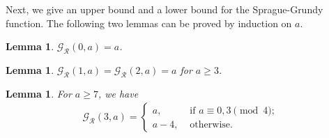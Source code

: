 \documentclass[12pt]{amsart}
\theoremstyle{plain}
\newtheorem{lemma}[proposition]{Lemma}
\theoremstyle{definition}
\theoremstyle{remark}
\begin{document}
Next, we give an upper bound and a lower bound for the Sprague-Grundy function. The following two lemmas can be proved by induction on $a$.

\smallskip
\begin{lemma} \label{BW-R0}
${\mathcal{G}}_{\mathcal{R}}(0,a) = a$.
\end{lemma}

\smallskip
\begin{lemma} \label{BW-R12}
${\mathcal{G}}_{\mathcal{R}}(1,a) = {\mathcal{G}}_{\mathcal{R}}(2,a) = a$ for $a \geq 3$.
\end{lemma}

\smallskip
\begin{lemma} \label{BW-R3}
For $a \geq 7$, we have
\begin{align*}
{\mathcal{G}}_{\mathcal{R}}(3,a) =
\begin{cases}
a,   &\text{ if $a \equiv 0,3 \pmod 4$};\\
a-4, &\text{ otherwise}.
\end{cases}
\end{align*}
\end{lemma}
\end{document}
